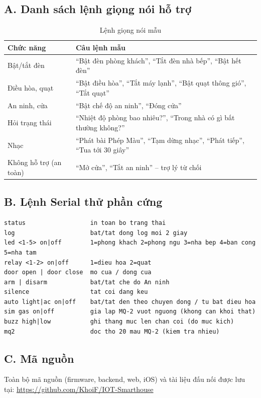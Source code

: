 \documentclass[12pt,a4paper]{extarticle}
\newcommand{\hang}{}  %
\begin{document}
\subsection*{A. Danh sách lệnh giọng nói hỗ trợ}
\begin{table}[H]
\centering
\begin{tabularx}{\linewidth}{|p{3.6cm}|L|}
\hline
\hang \textbf{Chức năng} & \textbf{Câu lệnh mẫu} \\ \hline
Bật/tắt đèn & ``Bật đèn phòng khách'', ``Tắt đèn nhà bếp'', ``Bật hết đèn'' \\ \hline
Điều hòa, quạt & ``Bật điều hòa'', ``Tắt máy lạnh'', ``Bật quạt thông gió'', ``Tắt quạt'' \\ \hline
An ninh, cửa & ``Bật chế độ an ninh'', ``Đóng cửa'' \\ \hline
Hỏi trạng thái & ``Nhiệt độ phòng bao nhiêu?'', ``Trong nhà có gì bất thường không?'' \\ \hline
Nhạc & ``Phát bài Phép Màu'', ``Tạm dừng nhạc'', ``Phát tiếp'', ``Tua tới 30 giây'' \\ \hline
Không hỗ trợ (an toàn) & ``Mở cửa'', ``Tắt an ninh'' -- trợ lý từ chối \\ \hline
\end{tabularx}
\caption{Lệnh giọng nói mẫu}
\label{tab:lenhgiongnoi}
\end{table}

\subsection*{B. Lệnh Serial thử phần cứng}
\begin{lstlisting}[language={}]
status                  in toan bo trang thai
log                     bat/tat dong log moi 2 giay
led <1-5> on|off        1=phong khach 2=phong ngu 3=nha bep 4=ban cong 5=nha tam
relay <1-2> on|off      1=dieu hoa 2=quat
door open | door close  mo cua / dong cua
arm | disarm            bat/tat che do An ninh
silence                 tat coi dang keu
auto light|ac on|off    bat/tat den theo chuyen dong / tu bat dieu hoa
sim gas on|off          gia lap MQ-2 vuot nguong (khong can khoi that)
buzz high|low           ghi thang muc len chan coi (do muc kich)
mq2                     doc tho 20 mau MQ-2 (kiem tra nhieu)
\end{lstlisting}

\subsection*{C. Mã nguồn}
Toàn bộ mã nguồn (firmware, backend, web, iOS) và tài liệu đấu nối được lưu tại: \url{https://github.com/KhoiF/IOT-Smarthouse}
\end{document}
